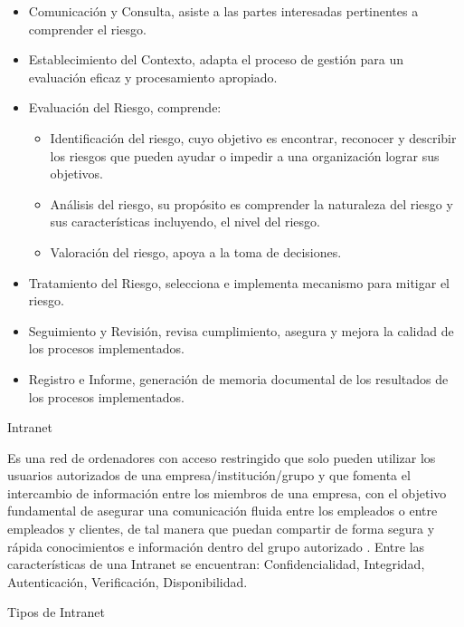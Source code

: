 \documentclass[a4paper,12pt]{article}
\begin{document}
\begin{itemize} 
\item Comunicación y Consulta, asiste a las partes interesadas pertinentes a comprender el 
riesgo. 
\item Establecimiento del Contexto, adapta el proceso de gestión para un evaluación 
eficaz y procesamiento apropiado. 
\item Evaluación del Riesgo, comprende:
\begin{itemize}
\item Identificación del riesgo, cuyo objetivo es encontrar, reconocer y describir los 
riesgos que pueden ayudar o impedir a una organización lograr sus objetivos. 
\item Análisis del riesgo, su propósito es comprender la naturaleza del riesgo y sus 
características incluyendo, el nivel del riesgo. 
\item Valoración del riesgo, apoya a la toma de decisiones.
\end{itemize} 
\item Tratamiento del Riesgo, selecciona e implementa mecanismo para mitigar el riesgo. 
\item Seguimiento y Revisión, revisa cumplimiento, asegura y mejora la calidad de los 
procesos implementados. 
\item Registro e Informe, generación de memoria documental de los resultados de los 
procesos implementados.
\end{itemize}
\break
\begin{bf}
Intranet\\ 
\end{bf}
\break
Es una red de ordenadores con acceso restringido que solo pueden utilizar los 
usuarios autorizados de una empresa/institución/grupo y que fomenta el intercambio
de información entre los miembros de una empresa, con el objetivo fundamental de 
asegurar una comunicación fluida entre los empleados o entre empleados y clientes, 
de tal manera que puedan compartir de forma segura y rápida conocimientos e 
información dentro del grupo autorizado \cite{Cabello2014}.
Entre las características de una Intranet se encuentran: Confidencialidad, 
Integridad, Autenticación, Verificación, Disponibilidad.\\
\break 
\begin{bf}
Tipos de Intranet\\
\end{bf}
\end{document}
